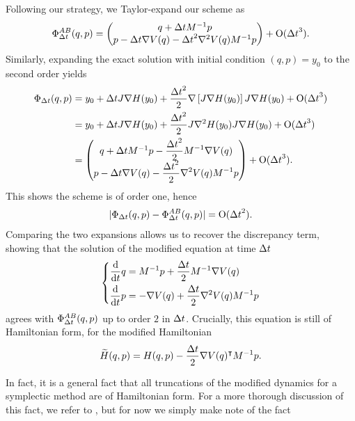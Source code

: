     \begin{example}
        \label{ex:modified_hamiltonian}
         Following our strategy, we Taylor-expand our scheme as
        \[\Phi_{{\Delta t}}^{AB}(q,p)=\begin{pmatrix}q+{\Delta t} M^{-1}p \\ p- {\Delta t} \nabla V(q) - {\Delta t}^2 \nabla^2 V(q) M^{-1}p\end{pmatrix}+\mathrm{O}({\Delta t}^3).\]
        Similarly, expanding the exact solution with initial condition $(q,p)=y_0$ to the second order yields
        \begin{align*} \Phi_{\Delta t}(q,p)&= y_0 +{\Delta t} J\nabla H(y_0)+\frac{{\Delta t}^2}2\nabla\left[J\nabla H(y_0)\right]J\nabla H(y_0)+\mathrm{O}({\Delta t}^3)\\
        &=y_0+{\Delta t} J\nabla H(y_0) + \displaystyle{\frac{{\Delta t}^2}{2}}J\nabla^2 H(y_0)J \nabla H(y_0)+\mathrm{O}({\Delta t}^3)\\
        &=\begin{pmatrix}q+{\Delta t} M^{-1}p -\displaystyle{\frac{{\Delta t}^2}{2}}M^{-1}\nabla V(q) \\ p -{\Delta t} \nabla V(q)-\displaystyle{\frac{{\Delta t}^2}{2}}\nabla^2 V(q)M^{-1}p\end{pmatrix}+\mathrm{O}({\Delta t}^3).\end{align*}
        This shows the scheme is of order one, hence
        \[|\Phi_{{\Delta t}}(q,p)-\Phi_{{\Delta t}}^{AB}(q,p)|=\mathrm{O}({\Delta t}^2).\]
        Comparing the two expansions allows us to recover the discrepancy term, showing that the solution of the modified equation at time ${\Delta t}$
        \[\left\{\begin{aligned}\frac{\mathrm d}{\mathrm{d}t} q &= M^{-1}p +\frac{{\Delta t}}2M^{-1}\nabla V(q)\\
        \frac{\mathrm d}{\mathrm{d}t} p &= -\nabla V(q) +\frac{{\Delta t}}2\nabla^2 V(q)M^{-1}p\end{aligned}\right.\]
        agrees with $\Phi_{{\Delta t}}^{AB}(q,p)$ up to order $2$ in ${\Delta t}$. Crucially, this equation is still of Hamiltonian form, for the modified Hamiltonian
        \begin{equation}\label{eq:modified_hamiltonian}\widetilde{H}(q,p)=H(q,p)-\frac{{\Delta t}}2 \nabla V(q)^\intercal M^{-1}p.\end{equation}
    \end{example}
    In fact, it is a general fact that all truncations of the modified dynamics for a symplectic method are of Hamiltonian form.
    For a more thorough discussion of this fact, we refer to \cite[Section IX.4]{H13}, but for now we simply make note of the fact
